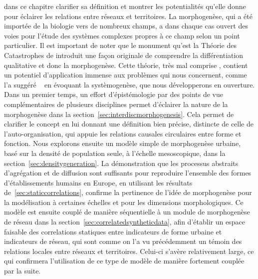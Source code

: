 dans ce chapitre clarifier sa définition et montrer les potentialités qu'elle donne pour éclairer les relations entre réseaux et territoires. La morphogenèse, qui a été importée de la biologie vers de nombreux champs, a dans chaque cas ouvert des voies pour l'étude des systèmes complexes propres à ce champ selon un point particulier. Il est important de noter que le monument qu'est la Théorie des Catastrophes de  introduit une façon originale de comprendre la différentiation qualitative et donc la morphogenèse. Cette théorie, très mal comprise , contient un potentiel d'application immense aux problèmes qui nous concernent, comme l'a suggéré ~\cite{durand2003geographes} en évoquant la systèmogenèse, que nous développerons en ouverture. Dans un premier temps, un effort d'épistémologie par des points de vue complémentaires de plusieurs disciplines permet d'éclairer la nature de la morphogenèse dans la section~\ref{sec:interdiscmorphogenesis}. Cela permet de clarifier le concept en lui donnant une définition bien précise, distincte de celle de l'auto-organisation, qui appuie les relations causales circulaires entre forme et fonction. Nous explorons ensuite un modèle simple de morphogenèse urbaine, basé sur la densité de population seule, à l'échelle mesoscopique, dans la section~\ref{sec:densitygeneration}. La démonstration que les processus abstraits d'agrégation et de diffusion sont suffisants pour reproduire l'ensemble des formes d'établissements humains en Europe, en utilisant les résultats de~\ref{sec:staticcorrelations}, confirme la pertinence de l'idée de morphogenèse pour la modélisation à certaines échelles et pour les dimensions morphologiques. Ce modèle est ensuite couplé de manière séquentielle à un module de morphogenèse de réseau dans la section~\ref{sec:correlatedsyntheticdata}, afin d'établir un espace faisable  des correlations statiques entre indicateurs de forme urbaine et indicateurs de réseau, qui sont comme on l'a vu précédemment un témoin des relations locales entre réseaux et territoires. Celui-ci s'avère relativement large, ce qui confirmera l'utilisation de ce type de modèle de manière fortement couplée par la suite.




\stars



